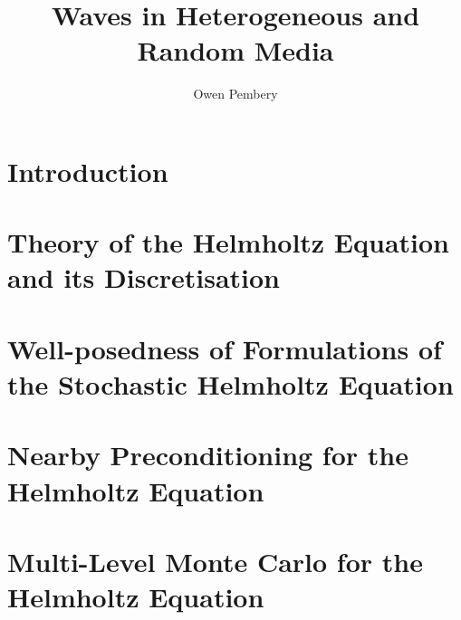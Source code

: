 \documentclass{report}
\title{Waves in Heterogeneous and Random Media}
\author{Owen Pembery}
\begin{document}
\maketitle

\chapter{Introduction}\label{chap:intro}


\chapter{Theory of the Helmholtz Equation and its Discretisation}\label{chap:background}


\chapter{Well-posedness of Formulations of the Stochastic Helmholtz Equation}\label{chap:stochastic}

\chapter{Nearby Preconditioning for the Helmholtz Equation}\label{chap:nbpc}

\chapter{Multi-Level Monte Carlo for the Helmholtz Equation}\label{chap:mlmc}



\end{document}
